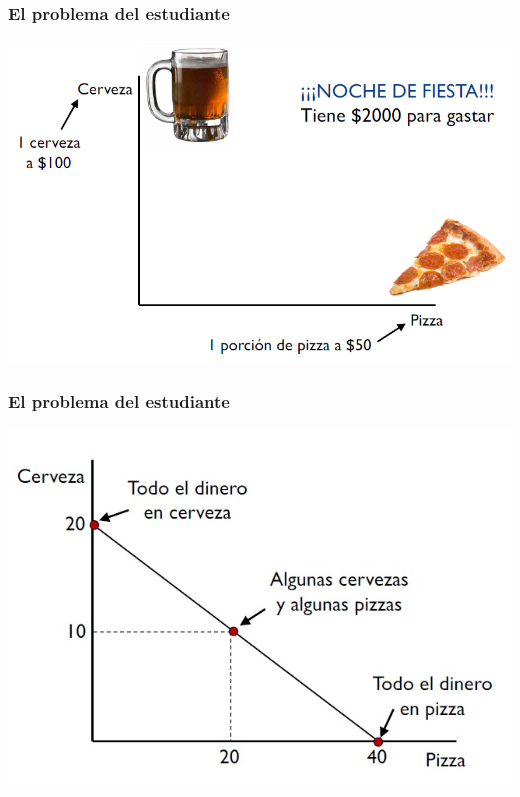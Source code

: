 \documentclass{beamer}
\begin{document}


\begin{frame}
\frametitle{El problema del estudiante}
\centering
\includegraphics[scale=0.5]{Slides Principios de Economia/Figures/Tema_02.2_rp.png}
\end{frame}

\begin{frame}
\frametitle{El problema del estudiante}
\centering
\includegraphics[scale=0.6]{Slides Principios de Economia/Figures/Tema_02.3_rp1.jpg}
\end{frame}
\end{document}

